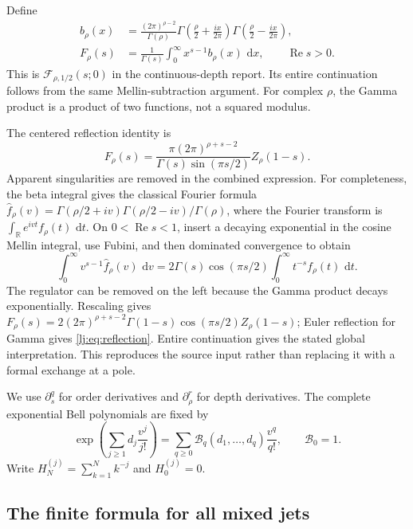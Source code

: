 \documentclass[11pt,a4paper]{article}
\numberwithin{equation}{section}
\theoremstyle{definition}
\theoremstyle{remark}
\DeclareMathOperator{\re}{Re}
\newcommand{\dd}{\,\mathrm d}
\begin{document}
Define
\begin{align}
 b_\rho(x)&=\frac{(2\pi)^{\rho-2}}{\Gamma(\rho)}
       \Gamma\left(\frac\rho2+\frac{ix}{2\pi}\right)
       \Gamma\left(\frac\rho2-\frac{ix}{2\pi}\right),
 \label{lj:eq:b}\\
 F_\rho(s)&=\frac1{\Gamma(s)}
       \int_0^\infty x^{s-1}b_\rho(x)\,\dd x,
       \qquad \re s>0.
 \label{lj:eq:F}
\end{align}
This is $\mathcal F_{\rho,1/2}(s;0)$ in the continuous-depth report.
Its entire continuation follows from the same Mellin-subtraction argument.
For complex $\rho$, the Gamma product is a product of two functions,
not a squared modulus.

The centered reflection identity is
\begin{equation}
 F_\rho(s)=\frac{\pi(2\pi)^{\rho+s-2}}
                 {\Gamma(s)\sin(\pi s/2)}Z_\rho(1-s).
 \label{lj:eq:reflection}
\end{equation}
Apparent singularities are removed in the combined expression. For
completeness, the beta integral gives the classical Fourier formula \cite{RamanujanFourier}
$\widehat f_\rho(v)=
\Gamma(\rho/2+iv)\Gamma(\rho/2-iv)/\Gamma(\rho)$, where the Fourier
transform is $\int_{\mathbb R}e^{ivt}f_\rho(t)\,\dd t$. On
$0<\re s<1$, insert a decaying exponential in the cosine Mellin
integral, use Fubini, and then dominated convergence to obtain
\[
 \int_0^\infty v^{s-1}\widehat f_\rho(v)\,\dd v
 =2\Gamma(s)\cos(\pi s/2)
       \int_0^\infty t^{-s}f_\rho(t)\,\dd t.
\]
The regulator can be removed on the left because the Gamma product
decays exponentially. Rescaling gives
$F_\rho(s)=2(2\pi)^{\rho+s-2}\Gamma(1-s)
\cos(\pi s/2)Z_\rho(1-s)$; Euler reflection for Gamma gives
\eqref{lj:eq:reflection}. Entire continuation gives the stated global
interpretation. This reproduces the source input rather than replacing
it with a formal exchange at a pole.

We use $\partial_s^q$ for order derivatives and $\partial_\rho^r$ for
depth derivatives. The complete exponential Bell polynomials are fixed by
\begin{equation}
 \exp\left(\sum_{j\geq1}d_j\frac{v^j}{j!}\right)
 =\sum_{q\geq0}\mathcal B_q(d_1,\ldots,d_q)\frac{v^q}{q!},
 \qquad \mathcal B_0=1.
 \label{lj:eq:Bell}
\end{equation}
Write $H_N^{(j)}=\sum_{k=1}^N k^{-j}$ and $H_0^{(j)}=0$.

\subsection{The finite formula for all mixed jets}
\end{document}
